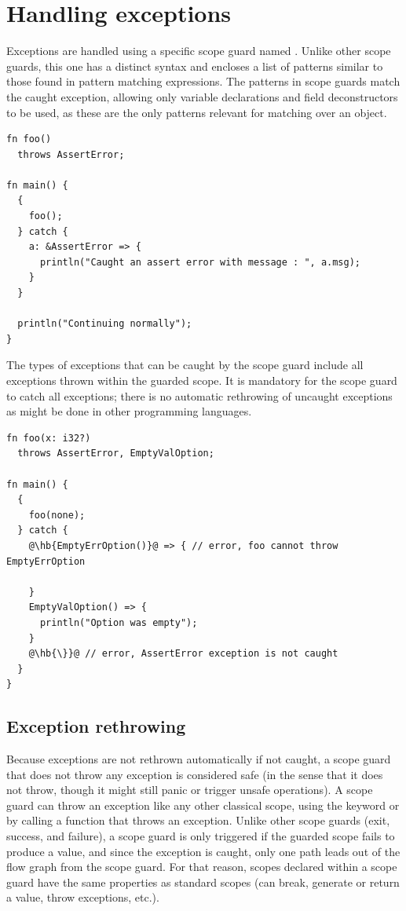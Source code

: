 \section{Handling exceptions}
\label{sec:error:catching_errors}

Exceptions are handled using a specific scope guard named . Unlike
other scope guards, this one has a distinct syntax and encloses a list of
patterns similar to those found in pattern matching expressions. The patterns in
 scope guards match the caught exception, allowing only
variable declarations and field deconstructors to be used, as these are the only
patterns relevant for matching over an object.


\begin{lstlisting}[style=coloredverbatim]
fn foo()
  throws AssertError;

fn main() {
  {
    foo();
  } catch {
    a: &AssertError => {
      println("Caught an assert error with message : ", a.msg);
    }
  }

  println("Continuing normally");
}
\end{lstlisting}

The types of exceptions that can be caught by the  scope guard
include all exceptions thrown within the guarded scope. It is mandatory for the
scope guard to catch all exceptions; there is no automatic rethrowing of
uncaught exceptions as might be done in other programming languages.

\begin{lstlisting}[style=coloredverbatimError, escapechar=@]
fn foo(x: i32?)
  throws AssertError, EmptyValOption;

fn main() {
  {
    foo(none);
  } catch {
    @\hb{EmptyErrOption()}@ => { // error, foo cannot throw EmptyErrOption

    }
    EmptyValOption() => {
      println("Option was empty");
    }
    @\hb{\}}@ // error, AssertError exception is not caught
  }
}
\end{lstlisting}

\subsection{Exception rethrowing}

Because exceptions are not rethrown automatically if not caught, a 
scope guard that does not throw any exception is considered safe (in the sense
that it does not throw, though it might still panic or trigger unsafe
operations). A  scope guard can throw an exception like any other
classical scope, using the keyword  or by calling a function that
throws an exception. Unlike other scope guards (exit, success, and failure), a
 scope guard is only triggered if the guarded scope fails to
produce a value, and since the exception is caught, only one path leads out of
the flow graph from the scope guard. For that reason, scopes declared within a
 scope guard have the same properties as standard scopes (can
break, generate or return a value, throw exceptions, etc.).


